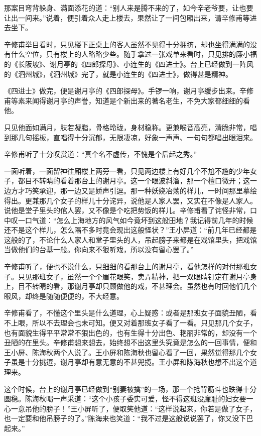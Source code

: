 \documentclass[12pt,UTF8]{ctexbook}
\begin{document}
{{{那案目弯背躲身、满面添花的道：“别人来是腾不来的了，如今辛老爷要，让也要让出一间来。”说着，便引着众人走上楼去，果然让了一间包厢出来，请辛修甫等进去坐下。

辛修甫举目看时，只见楼下正桌上的客人虽然不见得十分拥挤，却也坐得满满的没有什么空位，只有楼上的人略略少些。随手拿过一张戏单来看时，只见排的廉小福的《长阪坡》、谢月亭的《四郎探母》、小连生的《四进士》。台上已经做到一阵风的《泗州城》，《泗州城》完了，就是小连生的《四进士》，做得甚是精神。

《四进士》做完，便是谢月亭的《四郎探母》。手锣一响，谢月亭缓步出来。辛修甫等素来闻得谢月亭的声誉，知道是个新出来的著名老生，不免大家都细细的看他。

只见他面如满月，肤若凝脂，骨格玲珑，身材稳称。更兼喉音高亮，清脆非常，唱到那几句摇板，直唱得十分沉郁，无限凄凉，好象一声声、一句句都唱出眼泪来。

辛修甫听了十分叹赏道：“真个名不虚传，不愧是个后起之秀。”

一面听着，一面留神往厢楼上两旁一看，只见两边楼上有好几个不尬不尴的少年女子，都目不转睛的看着那台上的谢月亭。这一个眼波斜溜，那一个檀口微开；这一边方才巧笑承迎，那一边又是娇声引逗。那一种妖娆冶荡的样儿，一时间那里摹绘得出。更兼那几个女子的样儿十分诧异，说他是人家人罢，又实在不像是人家人。说他是堂子里头的倌人罢，又不像是个吃把势饭的样儿。辛修甫看了诧怪非常，口中叹一口气道：“怎么上海地方的风气如今竟坏到这般田地？我记得前几年的时候还不是这个样儿，怎么隔不多时竟会现出这般怪状？”王小屏道：“前几年已经都是这般的了，不论什么人家人和堂子里头的人，吊起膀子来都是在戏馆里头，把戏馆当做他们的台基一般。你向来不狠听戏，所以没有留心罢了。”

辛修甫听了，便也不说什么，只细细的看那台上的谢月亭，看他怎样的对付那班女子。只见那班女子，虽然一个个眉花眼笑，卖弄精神，把一双眼睛钉定在谢月亭身上，目不转睛的看，那谢月亭却只顾做他的戏，不甚理会。虽然也有时回他们几个眼风，却终是随随便便的，不大经意。

辛修甫看了，不懂这个里头是什么道理，心上疑惑：或者是那班女子面貌丑陋，看不上眼，所以不去理会也未可知。便又对着那班女子看了一看。只见那几个女子，也有面貌生得平平常常不狠出色的，也有生得十分出色、艳丽非常的，却没有一个丑陋的在里头。辛修甫想来想去，始终想不出这里头究竟是怎么的一回事情，便和王小屏、陈海秋两个人说了。王小屏和陈海秋也留心看了一回，果然觉得那几个女子虽是十分挑逗，谢月亭却有意无意的不甚兜揽。王小屏和陈海秋也想不出这个道理来。

这个时候，台上的谢月亭已经做到“别妻被擒”的一场，那一个抢背筋斗也跌得十分圆稳。陈海秋喝一声采道：“这个小孩子委实可爱，怪不得这班没廉耻的妇女要一心一意吊他的膀子！”王小屏听了，便取笑他道：“这样说起来，你若是做了女子，也一定要和他吊膀子的了。”陈海来也笑道：“我不过是这般说说罢了，你又没下巴起来。”

}}}
\end{document}
